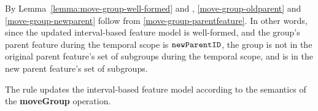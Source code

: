 By Lemma~\vref{lemma:move-group-well-formed} and , \ref{move-group-oldparent} and \ref{move-group-newparent} follow from \ref{move-group-parentfeature}. In other words, since the updated interval-based feature model is well-formed, and the group's parent feature during the temporal scope is $\texttt{newParentID}$, the group is not in the original parent feature's set of subgroups during the temporal scope, and is in the new parent feature's set of subgroups.
\\

\begin{lemma}
   The  rule updates the interval-based feature model according to the semantics of the \textbf{moveGroup} operation.
   \label{lemma:move-group-mod}
\end{lemma}
